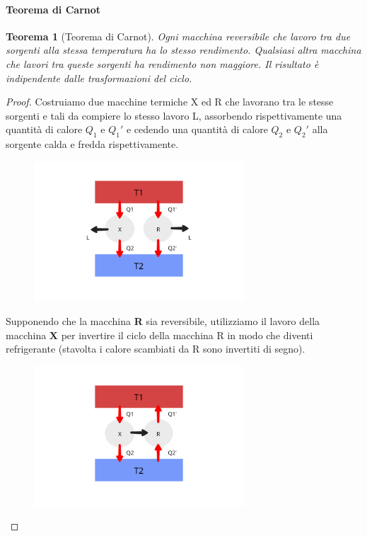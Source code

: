 \documentclass{article}
\newtheorem{thm}{Teorema}[section]
\begin{document}
\paragraph{Teorema di Carnot}
\begin{thm}[Teorema di Carnot]
Ogni macchina reversibile che lavoro tra due sorgenti alla stessa temperatura ha lo stesso rendimento. Qualsiasi altra macchina che lavori tra queste sorgenti ha rendimento non maggiore. Il risultato è indipendente dalle trasformazioni del ciclo. 
\end{thm}
\begin{proof}
Costruiamo due macchine termiche X ed R che lavorano tra le stesse sorgenti e tali da compiere lo stesso lavoro L, assorbendo rispettivamente una quantità di calore $Q_1$ e $Q_1'$ e cedendo una quantità di calore $Q_2$ e $Q_2'$ alla sorgente calda e fredda rispettivamente. 
\begin{figure}[H]
    \centering
    \includegraphics[width=0.7\textwidth]{TeoremaCarnot1.png}
    \label{TeoremaCarnot1}
\end{figure}
Supponendo che la macchina \textbf{R} sia reversibile, utilizziamo il lavoro della macchina \textbf{X} per invertire il ciclo della macchina R in modo che diventi refrigerante (stavolta i calore scambiati da R sono invertiti di segno).
\begin{figure}[H]
    \centering
    \includegraphics[width=0.7\textwidth]{TeoremaCarnot2.png}
    \label{TeoremaCarnot2}
\end{figure}


\end{proof}
\end{document}
